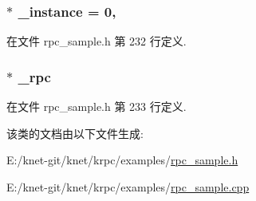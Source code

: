 \subsubsection[{\+\_\+instance}]{ $\ast$ \+\_\+instance = 0\hspace{0.3cm}{\ttfamily [static]}, {\ttfamily [private]}}\label{classrpc__sample_1_1rpc__sample__t_ab21a57379ad2184d3f228b9dfca29ad9}


在文件 rpc\+\_\+sample.\+h 第 232 行定义.

\hypertarget{classrpc__sample_1_1rpc__sample__t_a9e1768d7a6a84aa321a1e51a4b622c2d}{}
\subsubsection[{\+\_\+rpc}]{$\ast$ \+\_\+rpc\hspace{0.3cm}{\ttfamily [private]}}\label{classrpc__sample_1_1rpc__sample__t_a9e1768d7a6a84aa321a1e51a4b622c2d}


在文件 rpc\+\_\+sample.\+h 第 233 行定义.



该类的文档由以下文件生成\+:\begin{DoxyCompactItemize}
\item 
E\+:/knet-\/git/knet/krpc/examples/\hyperlink{rpc__sample_8h}{rpc\+\_\+sample.\+h}\item 
E\+:/knet-\/git/knet/krpc/examples/\hyperlink{rpc__sample_8cpp}{rpc\+\_\+sample.\+cpp}\end{DoxyCompactItemize}
